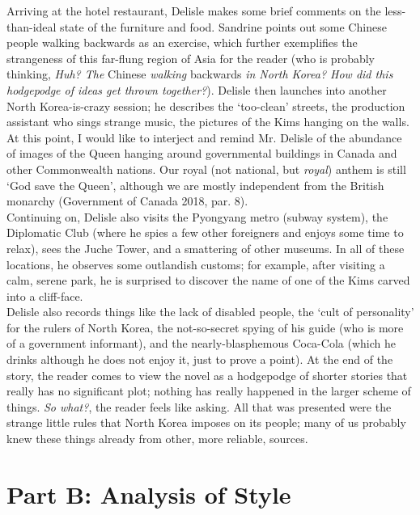\documentclass{article}
\begin{document}
\newline \qquad Arriving at the hotel restaurant, Delisle makes some brief comments on the less-than-ideal state of the furniture and food. Sandrine points out some Chinese people walking backwards as an exercise, which further exemplifies the strangeness of this far-flung region of Asia for the reader (who is probably thinking, \textit{Huh? The} Chinese \textit{walking} backwards \textit{in North Korea? How did this hodgepodge of ideas get thrown together?}). Delisle then launches into another North Korea-is-crazy session; he describes the ‘too-clean’ streets, the production assistant who sings strange music, the pictures of the Kims hanging on the walls. At this point, I would like to interject and remind Mr. Delisle of the abundance of images of the Queen hanging around governmental buildings in Canada and other Commonwealth nations. Our royal (not national, but \textit{royal}) anthem is still ‘God save the Queen’, although we are mostly independent from the British monarchy (Government of Canada 2018, par. 8). \\

\newline \qquad Continuing on, Delisle also visits the Pyongyang metro (subway system), the Diplomatic Club (where he spies a few other foreigners and enjoys some time to relax), sees the Juche Tower, and a smattering of other museums. In all of these locations, he observes some outlandish customs; for example, after visiting a calm, serene park, he is surprised to discover the name of one of the Kims carved into a cliff-face. \\

\qquad Delisle also records things like the lack of disabled people, the ‘cult of personality’ for the rulers of North Korea, the not-so-secret spying of his guide (who is more of a government informant), and the nearly-blasphemous Coca-Cola (which he drinks although he does not enjoy it, just to prove a point). At the end of the story, the reader comes to view the novel as a hodgepodge of shorter stories that really has no significant plot; nothing has really happened in the larger scheme of things. \textit{So what?}, the reader feels like asking. All that was presented were the strange little rules that North Korea imposes on its people; many of us probably knew these things already from other, more reliable, sources.\\

\section{Part B: Analysis of Style}
\end{document}
